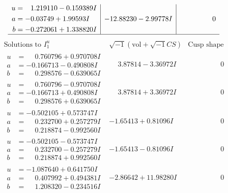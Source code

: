 \documentclass[1p]{elsarticle_modified}
\theoremstyle{definition}
\newcommand{\I}{\sqrt{-1}}
\begin{document}
$$\begin{array}{c|c|c}
\begin{aligned}
u &= \phantom{-}1.219110 - 0.159389 I \\
a &= -0.03749 + 1.99593 I \\
b &= -0.272061 + 1.338820 I\end{aligned}
 & -12.88230 - 2.99778 I & \phantom{-0.000000 } 0\\
 \hline 
 \end{array}$$\newpage$$\begin{array}{c|c|c}  
\text{Solutions to }I^u_{1}& \I (\text{vol} + \sqrt{-1}CS) & \text{Cusp shape}\\
 \hline 
\begin{aligned}
u &= \phantom{-}0.760796 + 0.970708 I \\
a &= -0.166713 - 0.490808 I \\
b &= \phantom{-}0.298576 - 0.639065 I\end{aligned}
 & \phantom{-}3.87814 - 3.36972 I & \phantom{-0.000000 } 0 \\ \hline\begin{aligned}
u &= \phantom{-}0.760796 - 0.970708 I \\
a &= -0.166713 + 0.490808 I \\
b &= \phantom{-}0.298576 + 0.639065 I\end{aligned}
 & \phantom{-}3.87814 + 3.36972 I & \phantom{-0.000000 } 0 \\ \hline\begin{aligned}
u &= -0.502105 + 0.573747 I \\
a &= \phantom{-}0.232700 + 0.257279 I \\
b &= \phantom{-}0.218874 - 0.992560 I\end{aligned}
 & -1.65413 + 0.81096 I & \phantom{-0.000000 } 0 \\ \hline\begin{aligned}
u &= -0.502105 - 0.573747 I \\
a &= \phantom{-}0.232700 - 0.257279 I \\
b &= \phantom{-}0.218874 + 0.992560 I\end{aligned}
 & -1.65413 - 0.81096 I & \phantom{-0.000000 } 0 \\ \hline\begin{aligned}
u &= -1.087640 + 0.641750 I \\
a &= \phantom{-}0.407992 + 0.494381 I \\
b &= \phantom{-}1.208320 - 0.234516 I\end{aligned}
 & -2.86642 + 11.98280 I & \phantom{-0.000000 } 0 \\ \hline\begin{aligned}

\end{aligned}
\end{array}$$
\end{document}
